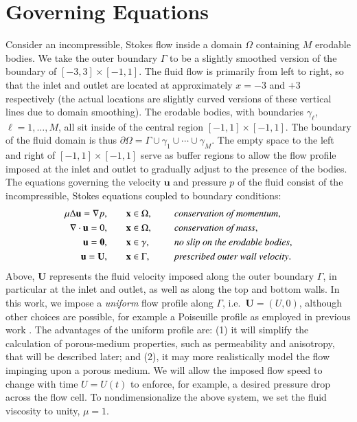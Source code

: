 \documentclass[3p]{elsarticle}
\newcommand{\bd}{{\partial}}
\newcommand{\grad}{{\nabla}}
\newcommand{\uu}{{\mathbf{u}}}
\newcommand{\UU}{{\mathbf{U}}}
\newcommand{\xx}{{\mathbf{x}}}
\def\gap{\hspace*{.2in}}
\begin{document}
\section{Governing Equations}
\label{sec:formulation}

Consider an incompressible, Stokes flow inside a domain $\Omega$ containing $M$ erodable bodies. We take the outer boundary $\Gamma$ to be a slightly smoothed version of the boundary of $[-3,3] \times [-1,1]$. The fluid flow is primarily from left to right, so that the inlet and outlet are located at approximately $x=-3$ and $+3$ respectively (the actual locations are slightly curved versions of these vertical lines due to domain smoothing). The erodable bodies, with boundaries $\gamma_\ell$, $\ell = 1,\ldots,M$, all sit inside of the central region $[-1,1] \times [-1,1]$. The boundary of the fluid domain is thus $\bd \Omega = \Gamma \cup \gamma_1 \cup \cdots \cup \gamma_M$. 
The empty space to the left and right of $[-1,1] \times [-1,1]$ serve as buffer regions to allow the flow profile imposed at the inlet and outlet to gradually adjust to the presence of the bodies. The equations governing the velocity $\uu$ and pressure $p$ of the fluid consist of the incompressible, Stokes equations coupled to boundary conditions:
\begin{equation}
\label{eqn:StokesEq}
  \begin{split}
    \mu \Delta \uu = \grad p, &\hspace{20pt} \xx \in \Omega, \gap 
      &&\mbox{\em conservation of momentum}, \\
    \grad \cdot \uu = 0, &\hspace{20pt} \xx \in \Omega, \gap 
      &&\mbox{\em conservation of mass}, \\
    \uu = \mathbf{0}, &\hspace{20pt} \xx \in \gamma, \gap 
      &&\mbox{\em no slip on the erodable bodies}, \\
    \uu = \UU, &\hspace{20pt} \xx \in \Gamma, \gap 
      &&\mbox{\em prescribed outer wall velocity}.
  \end{split}
\end{equation}
Above, $\UU$ represents the fluid velocity imposed along the outer boundary $\Gamma$, in particular at the inlet and outlet, as well as along the top and bottom walls. In this work, we impose a {\em uniform} flow profile along $\Gamma$, i.e.~$\UU = (U,0)$, although other choices are possible, for example a Poiseuille profile as employed in previous work \cite{quaife2018boundary, chiu2020viscous}. The advantages of the uniform profile are: (1) it will simplify the calculation of porous-medium properties, such as permeability and anisotropy, that will be described later; and (2), it may more realistically model the flow impinging upon a porous medium. We will allow the imposed flow speed to change with time $U = U(t)$ to enforce, for example, a desired pressure drop across the flow cell. To nondimensionalize the above system, we set the fluid viscosity to unity, $\mu = 1$.
\end{document}
